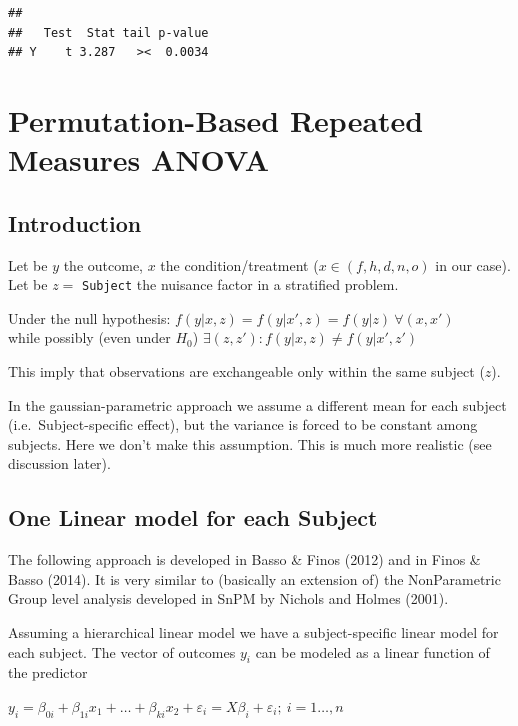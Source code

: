 \documentclass[
]{article}
\begin{document}
\begin{verbatim}
## 
##   Test  Stat tail p-value
## Y    t 3.287   ><  0.0034
\end{verbatim}

\hypertarget{permutation-based-repeated-measures-anova}{%
\section{Permutation-Based Repeated Measures
ANOVA}\label{permutation-based-repeated-measures-anova}}

\hypertarget{introduction-1}{%
\subsection{Introduction}\label{introduction-1}}

Let be \(y\) the outcome, \(x\) the condition/treatment
(\(x\in (f,h,d,n,o)\) in our case). Let be \(z=\) \texttt{Subject} the
nuisance factor in a stratified problem.

Under the null hypothesis:
\(f(y|x,z)=f(y|x',z)=f(y|z) \ \forall (x,x')\)\\
while possibly (even under \(H_0\))
\(\exists (z,z'): f(y|x,z) \neq f(y|x',z')\)

This imply that observations are exchangeable only within the same
subject (\(z\)).

In the gaussian-parametric approach we assume a different mean for each
subject (i.e.~Subject-specific effect), but the variance is forced to be
constant among subjects. Here we don't make this assumption. This is
much more realistic (see discussion later).

\hypertarget{one-linear-model-for-each-subject}{%
\subsection{One Linear model for each
Subject}\label{one-linear-model-for-each-subject}}

The following approach is developed in Basso \& Finos (2012) and in
Finos \& Basso (2014). It is very similar to (basically an extension of)
the NonParametric Group level analysis developed in SnPM by Nichols and
Holmes (2001).

Assuming a hierarchical linear model we have a subject-specific linear
model for each subject. The vector of outcomes \(y_i\) can be modeled as
a linear function of the predictor

\(y_i=\beta_{0i}+\beta_{1i}x_1+\ldots+\beta_{ki}x_2+\varepsilon_i=X\beta_i+\varepsilon_i; \ i=1\ldots,n\)
\end{document}
